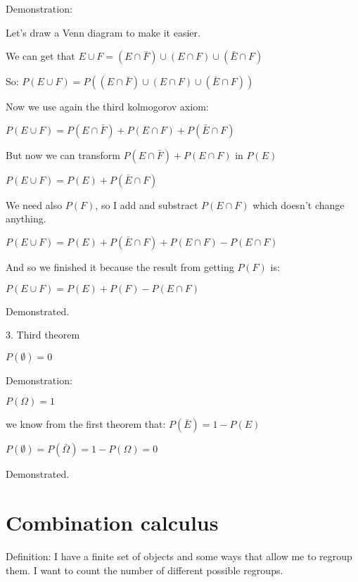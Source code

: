 \documentclass{article}
\begin{document}
Demonstration:

Let's draw a Venn diagram to make it easier.


We can get that $E \cup F = (E \cap \bar F) \cup (E \cap F) \cup (\bar E \cap F)$

So: $P(E \cup F) = P((E \cap \bar F) \cup (E \cap F) \cup (\bar E \cap F))$

Now we use again the third kolmogorov axiom:

$P(E \cup F) = P(E \cap \bar F) + P(E \cap F) + P(\bar E \cap F)$

But now we can transform $P(E \cap \bar F) + P(E \cap F)$ in $P(E)$ 

$P(E \cup F) = P(E) + P(\bar E \cap F)$

We need also $P(F)$, so I add and substract $P(E \cap F)$ which doesn't change anything.

$P(E \cup F) = P(E) + P(\bar E \cap F) + P(E \cap F) - P(E \cap F)$

And so we finished it because the result from getting $P(F)$ is:

$P(E \cup F) = P(E) + P(F) - P(E \cap F)$

Demonstrated.
\bigskip

3. Third theorem

$P(\emptyset) = 0$
\bigskip

Demonstration:

$P(\Omega) = 1$

we know from the first theorem that: $P(\bar E) = 1 - P(E)$

$P(\emptyset) = P(\bar \Omega) = 1 - P(\Omega) = 0$

Demonstrated.

\section{Combination calculus}

Definition: I have a finite set of objects and some ways that allow me to regroup them. I want to count the number of different possible regroups.
\end{document}

